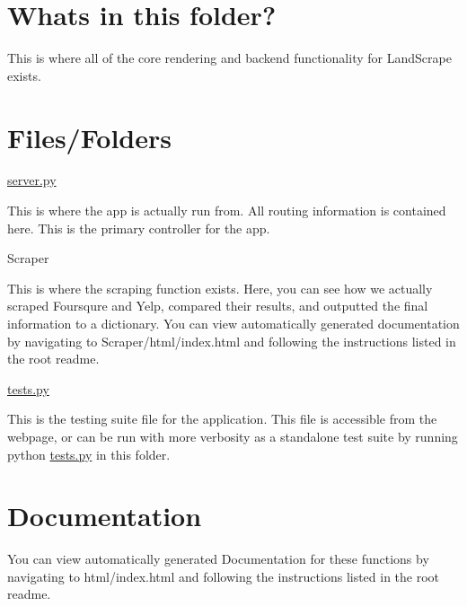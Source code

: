 \section*{What\textquotesingle{}s in this folder?}

This is where all of the core rendering and backend functionality for Land\+Scrape exists.

\section*{Files/\+Folders}


\begin{DoxyItemize}
\item \mbox{\hyperlink{server_8py}{server.\+py}}
\end{DoxyItemize}

This is where the app is actually run from. All routing information is contained here. This is the primary controller for the app.
\begin{DoxyItemize}
\item Scraper
\end{DoxyItemize}

This is where the scraping function exists. Here, you can see how we actually scraped Foursqure and Yelp, compared their results, and outputted the final information to a dictionary. You can view automatically generated documentation by navigating to {\ttfamily Scraper/html/index.\+html} and following the instructions listed in the root readme.


\begin{DoxyItemize}
\item \mbox{\hyperlink{tests_8py}{tests.\+py}}
\end{DoxyItemize}

This is the testing suite file for the application. This file is accessible from the webpage, or can be run with more verbosity as a standalone test suite by running {\ttfamily python \mbox{\hyperlink{tests_8py}{tests.\+py}}} in this folder.

\section*{Documentation}

You can view automatically generated Documentation for these functions by navigating to {\ttfamily html/index.\+html} and following the instructions listed in the root readme. 